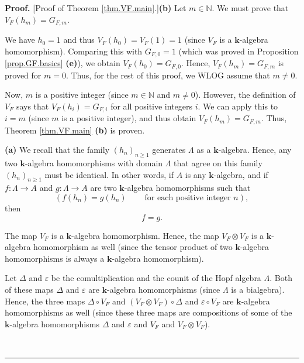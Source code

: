 \documentclass[numbers=enddot,12pt,final,onecolumn,notitlepage]{scrartcl}%
\theoremstyle{definition}
\newenvironment{proof}[1][Proof]{\noindent\textbf{#1.} }{\ \rule{0.5em}{0.5em}}
\newenvironment{verlong}{}{}
\begin{document}
\begin{verlong}
\begin{proof}
[Proof of Theorem \ref{thm.VF.main}.]\textbf{(b)} Let $m\in\mathbb{N}$. We
must prove that $V_{F}\left(  h_{m}\right)  =G_{F,m}$.

We have $h_{0}=1$ and thus $V_{F}\left(  h_{0}\right)  =V_{F}\left(  1\right)
=1$ (since $V_{F}$ is a $\mathbf{k}$-algebra homomorphism). Comparing this
with $G_{F,0}=1$ (which was proved in Proposition \ref{prop.GF.basics}
\textbf{(e)}), we obtain $V_{F}\left(  h_{0}\right)  =G_{F,0}$. Hence,
$V_{F}\left(  h_{m}\right)  =G_{F,m}$ is proved for $m=0$. Thus, for the rest
of this proof, we WLOG assume that $m\neq0$.

Now, $m$ is a positive integer (since $m\in\mathbb{N}$ and $m\neq0$). However,
the definition of $V_{F}$ says that $V_{F}\left(  h_{i}\right)  =G_{F,i}$ for
all positive integers $i$. We can apply this to $i=m$ (since $m$ is a positive
integer), and thus obtain $V_{F}\left(  h_{m}\right)  =G_{F,m}$. Thus, Theorem
\ref{thm.VF.main} \textbf{(b)} is proven.

\textbf{(a)} We recall that the family $\left(  h_{n}\right)  _{n\geq1}$
generates $\Lambda$ as a $\mathbf{k}$-algebra. Hence, any two $\mathbf{k}%
$-algebra homomorphisms with domain $\Lambda$ that agree on this family
$\left(  h_{n}\right)  _{n\geq1}$ must be identical. In other words, if $A$ is
any $\mathbf{k}$-algebra, and if $f:\Lambda\rightarrow A$ and $g:\Lambda
\rightarrow A$ are two $\mathbf{k}$-algebra homomorphisms such that%
\[
\left(  f\left(  h_{n}\right)  =g\left(  h_{n}\right)
\ \ \ \ \ \ \ \ \ \ \text{for each positive integer }n\right)  ,
\]
then
\begin{equation}
f=g. \label{pf.thm.VF.main.a.f=g}%
\end{equation}


The map $V_{F}$ is a $\mathbf{k}$-algebra homomorphism. Hence, the map
$V_{F}\otimes V_{F}$ is a $\mathbf{k}$-algebra homomorphism as well (since the
tensor product of two $\mathbf{k}$-algebra homomorphisms is always a
$\mathbf{k}$-algebra homomorphism).

Let $\Delta$ and $\varepsilon$ be the comultiplication and the counit of the
Hopf algebra $\Lambda$. Both of these maps $\Delta$ and $\varepsilon$ are
$\mathbf{k}$-algebra homomorphisms (since $\Lambda$ is a bialgebra). Hence,
the three maps $\Delta\circ V_{F}$ and $\left(  V_{F}\otimes V_{F}\right)
\circ\Delta$ and $\varepsilon\circ V_{F}$ are $\mathbf{k}$-algebra
homomorphisms as well (since these three maps are compositions of some of the
$\mathbf{k}$-algebra homomorphisms $\Delta$ and $\varepsilon$ and $V_{F}$ and
$V_{F}\otimes V_{F}$).


\end{proof}
\end{verlong}
\end{document}
